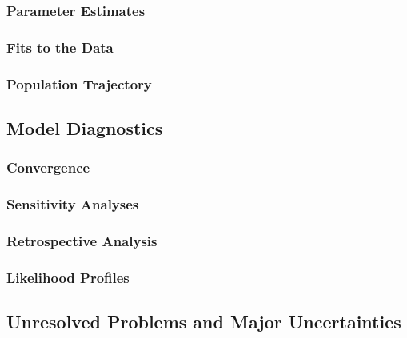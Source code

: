 \documentclass[
]{scrartcl}
\begin{document}
\hypertarget{parameter-estimates}{%
\subsubsection{Parameter Estimates}\label{parameter-estimates}}

\hypertarget{fits-to-the-data}{%
\subsubsection{Fits to the Data}\label{fits-to-the-data}}

\hypertarget{population-trajectory}{%
\subsubsection{Population Trajectory}\label{population-trajectory}}

\hypertarget{model-diagnostics}{%
\subsection{Model Diagnostics}\label{model-diagnostics}}

\hypertarget{convergence}{%
\subsubsection{Convergence}\label{convergence}}

\hypertarget{sensitivity-analyses}{%
\subsubsection{Sensitivity Analyses}\label{sensitivity-analyses}}

\hypertarget{retrospective-analysis}{%
\subsubsection{Retrospective Analysis}\label{retrospective-analysis}}

\hypertarget{likelihood-profiles}{%
\subsubsection{Likelihood Profiles}\label{likelihood-profiles}}

\hypertarget{unresolved-problems-and-major-uncertainties-1}{%
\subsection{Unresolved Problems and Major
Uncertainties}\label{unresolved-problems-and-major-uncertainties-1}}
\end{document}
